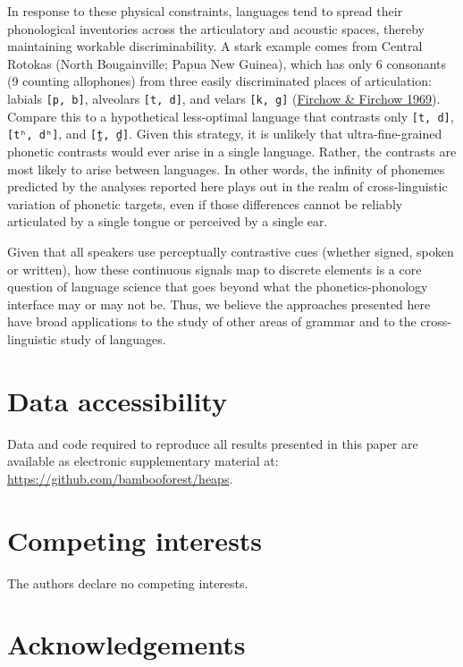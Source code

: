\documentclass[
]{article}
\begin{document}
In response to these physical constraints, languages tend to spread
their phonological inventories across the articulatory and acoustic
spaces, thereby maintaining workable discriminability. A stark example
comes from Central Rotokas (North Bougainville; Papua New Guinea), which
has only 6 consonants (9 counting allophones) from three easily
discriminated places of articulation: labials \texttt{{[}p,\ b{]}},
alveolars \texttt{{[}t,\ d{]}}, and velars \texttt{{[}k,\ g{]}}
(\protect\hyperlink{ref-FirchowFirchow1969}{Firchow \& Firchow 1969}).
Compare this to a hypothetical less-optimal language that contrasts only
\texttt{{[}t,\ d{]}}, \texttt{{[}tʰ,\ dʰ{]}}, and \texttt{{[}t̪,\ d̪{]}}.
Given this strategy, it is unlikely that ultra-fine-grained phonetic
contrasts would ever arise in a single language. Rather, the contrasts
are most likely to arise between languages. In other words, the infinity
of phonemes predicted by the analyses reported here plays out in the
realm of cross-linguistic variation of phonetic targets, even if those
differences cannot be reliably articulated by a single tongue or
perceived by a single ear.

Given that all speakers use perceptually contrastive cues (whether
signed, spoken or written), how these continuous signals map to discrete
elements is a core question of language science that goes beyond what
the phonetics-phonology interface may or may not be. Thus, we believe
the approaches presented here have broad applications to the study of
other areas of grammar and to the cross-linguistic study of languages.

\hypertarget{data-accessibility}{%
\section{Data accessibility}\label{data-accessibility}}

Data and code required to reproduce all results presented in this paper
are available as electronic supplementary material at:
\url{https://github.com/bambooforest/heaps}.

\hypertarget{competing-interests}{%
\section{Competing interests}\label{competing-interests}}

The authors declare no competing interests.

\hypertarget{acknowledgements}{%
\section{Acknowledgements}\label{acknowledgements}}
\end{document}
